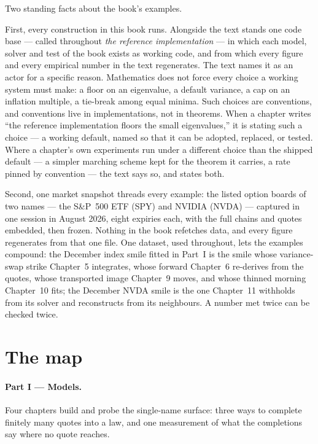 Two standing facts about the book's examples.

First, every construction in this book runs.  Alongside the text
stands one code base --- called throughout \emph{the reference
implementation} --- in which each model, solver and test of the book
exists as working code, and from which every figure and every
empirical number in the text regenerates.  The text names it as an
actor for a specific reason.  Mathematics does not force every choice
a working system must make: a floor on an eigenvalue, a default
variance, a cap on an inflation multiple, a tie-break among equal
minima.  Such choices are conventions, and conventions live in
implementations, not in theorems.  When a chapter writes ``the
reference implementation floors the small eigenvalues,'' it is
stating such a choice --- a working default, named so that it can be
adopted, replaced, or tested.  Where a chapter's own experiments run
under a different choice than the shipped default --- a simpler
marching scheme kept for the theorem it carries, a rate pinned by
convention --- the text says so, and states both.

Second, one market snapshot threads every example: the listed option
boards of two names --- the S\&P~500 ETF (SPY) and NVIDIA (NVDA) ---
captured in one session in August 2026, eight expiries each, with
the full chains and quotes embedded, then frozen.  Nothing in the
book refetches data, and every figure regenerates from that one
file.  One dataset, used throughout, lets the examples compound: the
December index smile fitted in Part~I is the smile whose
variance-swap strike Chapter~5 integrates, whose forward Chapter~6
re-derives from the quotes, whose transported image Chapter~9 moves,
and whose thinned morning Chapter~10 fits; the December NVDA smile
is the one Chapter~11 withholds from its solver and reconstructs
from its neighbours.  A number met twice can be checked
twice.

\section{The map}
\label{sec:intromap}

\paragraph{Part I --- Models.}
Four chapters build and probe the single-name surface: three ways to
complete finitely many quotes into a law, and one measurement of what
the completions say where no quote reaches.


